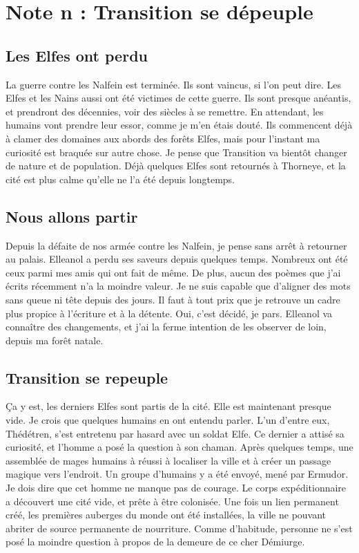 \section{Note n : Transition se dépeuple}
\subsection{Les Elfes ont perdu}
La guerre contre les Nalfein est terminée. Ils sont vaincus, si l'on peut dire. Les Elfes et les Nains aussi ont été victimes de cette guerre. Ils sont presque anéantis, et prendront des décennies, voir des siècles à se remettre. En attendant, les humains vont prendre leur essor, comme je m'en étais douté. Ils commencent déjà à clamer des domaines aux abords des forêts Elfes, mais pour l'instant ma curiosité est braquée sur autre chose. Je pense que Transition va bientôt changer de nature et de population. Déjà quelques Elfes sont retournés à Thorneye, et la cité est plus calme qu'elle ne l'a été depuis longtemps.
\subsection{Nous allons partir}
Depuis la défaite de nos armée contre les Nalfein, je pense sans arrêt à retourner au palais. Elleanol a perdu ses saveurs depuis quelques temps. Nombreux ont été ceux parmi mes amis qui ont fait de même. De plus, aucun des poèmes que j'ai écrits récemment n'a la moindre valeur. Je ne suis capable que d'aligner des mots sans queue ni tête depuis des jours. Il faut à tout prix que je retrouve un cadre plus propice à l'écriture et à la détente. Oui, c'est décidé, je pars. Elleanol va connaître des changements, et j'ai la ferme intention de les observer de loin, depuis ma forêt natale.
\subsection{Transition se repeuple}
Ça y est, les derniers Elfes sont partis de la cité. Elle est maintenant presque vide. Je crois que quelques humains en ont entendu parler. L'un d'entre eux, Thédétren, s'est entretenu par hasard avec un soldat Elfe. Ce dernier a attisé sa curiosité, et l'homme a posé la question à son chaman. Après quelques temps, une assemblée de mages humains à réussi à localiser la ville et à créer un passage magique vers l'endroit. Un groupe d'humains y a été envoyé, mené par Ermudor. Je dois dire que cet homme ne manque pas de courage. Le corps expéditionnaire a découvert une cité vide, et prête à être colonisée. Une fois un lien permanent créé, les premières auberges du monde ont été installées, la ville ne pouvant abriter de source permanente de nourriture. Comme d'habitude, personne ne s'est posé la moindre question à propos de la demeure de ce cher Démiurge.